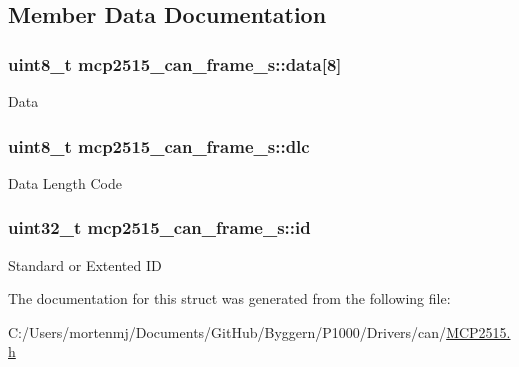 \subsection{Member Data Documentation}
\hypertarget{structmcp2515__can__frame__s_a438135061fca0fdd743952c80879929f}{
\subsubsection[{data}]{\setlength{\rightskip}{0pt plus 5cm}uint8\-\_\-t mcp2515\-\_\-can\-\_\-frame\-\_\-s\-::data\mbox{[}8\mbox{]}}}\label{structmcp2515__can__frame__s_a438135061fca0fdd743952c80879929f}
Data \hypertarget{structmcp2515__can__frame__s_abee712aaf50a42a28958457427e91831}{
\subsubsection[{dlc}]{\setlength{\rightskip}{0pt plus 5cm}uint8\-\_\-t mcp2515\-\_\-can\-\_\-frame\-\_\-s\-::dlc}}\label{structmcp2515__can__frame__s_abee712aaf50a42a28958457427e91831}
Data Length Code \hypertarget{structmcp2515__can__frame__s_acd4002e0542e51d853b9012578f0216b}{
\subsubsection[{id}]{\setlength{\rightskip}{0pt plus 5cm}uint32\-\_\-t mcp2515\-\_\-can\-\_\-frame\-\_\-s\-::id}}\label{structmcp2515__can__frame__s_acd4002e0542e51d853b9012578f0216b}
Standard or Extented I\-D 

The documentation for this struct was generated from the following file\-:\begin{DoxyCompactItemize}
\item 
C\-:/\-Users/mortenmj/\-Documents/\-Git\-Hub/\-Byggern/\-P1000/\-Drivers/can/\hyperlink{_m_c_p2515_8h}{M\-C\-P2515.\-h}\end{DoxyCompactItemize}
